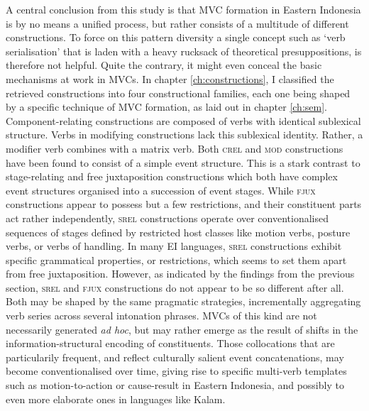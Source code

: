 A central conclusion from this study is  that MVC formation in Eastern Indonesia is by no means a unified process, but rather consists of a multitude of different constructions. To force on this pattern diversity a single concept such as `verb serialisation' that is laden with a heavy rucksack of theoretical presuppositions, is therefore not helpful. Quite the contrary, it might even conceal the basic mechanisms at work in MVCs. In chapter \ref{ch:constructions}, I classified the retrieved constructions into four constructional families, each one being shaped by a specific technique of MVC formation, as laid out in chapter \ref{ch:sem}. Component-relating constructions are composed of verbs with identical sublexical structure. Verbs in modifying constructions lack this sublexical identity. Rather, a modifier verb combines with a matrix verb. Both \textsc{crel} and \textsc{mod} constructions have been found to consist of a simple event structure. This is a stark contrast to stage-relating and free juxtaposition constructions which both have complex event structures organised into a succession of event stages. While \textsc{fjux} constructions appear to possess but a few restrictions, and their constituent parts act rather independently, \textsc{srel} constructions operate over conventionalised sequences of stages defined by restricted host classes like motion verbs, posture verbs, or verbs of handling. In many EI languages, \textsc{srel} constructions exhibit specific grammatical properties, or restrictions, which seems to set them apart from free juxtaposition. However, as indicated by the findings from the previous section, \textsc{srel} and \textsc{fjux} constructions do not appear to be so different after all. Both may be shaped by the same pragmatic strategies, incrementally aggregating verb series across several intonation phrases. MVCs of this kind are not necessarily generated \textit{ad hoc}, but may rather emerge as the result of shifts in the information-structural encoding of constituents. Those collocations that are particularily frequent, and reflect culturally salient event concatenations, may become conventionalised over time, giving rise to specific multi-verb templates such as motion-to-action or cause-result in Eastern Indonesia, and possibly to even more elaborate ones in languages like Kalam.

